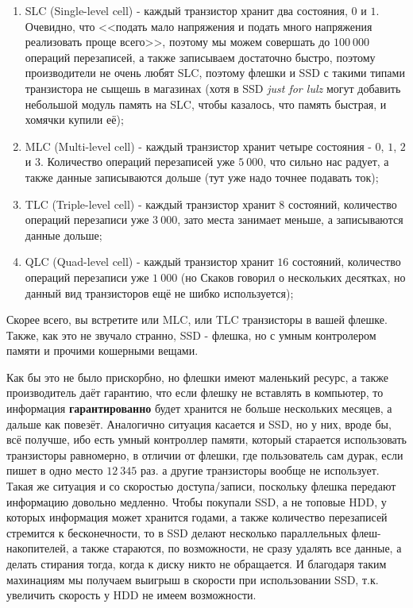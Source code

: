 \documentclass[12pt, a4paper]{article}
\begin{document}
\begin{enumerate}
	\item SLC (Single-level cell) - каждый транзистор хранит два состояния, $0$ и $1$. Очевидно, что <<подать мало напряжения и подать много напряжения реализовать проще всего>>, поэтому мы можем совершать до $100 \ 000$ операций перезаписей, а также записываем достаточно быстро, поэтому производители не очень любят SLC, поэтому флешки и SSD с такими типами транзистора не сыщешь в магазинах (хотя в SSD \textit{just for lulz} могут добавить небольшой модуль память на SLC, чтобы казалось, что память быстрая, и хомячки купили её);
	\item MLC (Multi-level cell) - каждый транзистор хранит четыре состояния - $0$, $1$, $2$ и $3$. Количество операций перезаписей уже $5 \ 000$, что сильно нас радует, а также данные записываются дольше (тут уже надо точнее подавать ток);
	\item TLC (Triple-level cell) - каждый транзистор хранит $8$ состояний, количество операций перезаписи уже $3 \ 000$, зато места занимает меньше, а записываются данные дольше;
	\item QLC (Quad-level cell) - каждый транзистор хранит $16$ состояний, количество операций перезаписи уже $1 \ 000$ (но Скаков говорил о нескольких десятках, но данный вид транзисторов ещё не шибко используется);
\end{enumerate}

Скорее всего, вы встретите или MLC, или TLC транзисторы в вашей флешке. Также, как это не звучало странно, SSD - флешка, но с умным контролером памяти и прочими кошерными вещами. 

Как бы это не было прискорбно, но флешки имеют маленький ресурс, а также производитель даёт гарантию, что если флешку не вставлять в компьютер, то информация \textbf{гарантированно} будет хранится не больше нескольких месяцев, а дальше как повезёт. Аналогично ситуация касается и SSD, но у них, вроде бы, всё получше, ибо есть умный контроллер памяти, который старается использовать транзисторы равномерно, в отличии от флешки, где пользователь сам дурак, если пишет в одно место $12 \ 345$ раз. а другие транзисторы вообще не использует. Такая же ситуация и со скоростью доступа/записи, поскольку флешка передают информацию довольно медленно. Чтобы покупали SSD, а не топовые HDD, у которых информация может хранится годами, а также количество перезаписей стремится к бесконечности, то в SSD делают несколько параллельных флеш-накопителей, а также стараются, по возможности, не сразу удалять все данные, а делать стирания тогда, когда к диску никто не обращается. И благодаря таким махинациям мы получаем выигрыш в скорости при использовании SSD, т.к. увеличить скорость у HDD не имеем возможности. 
\end{document}
